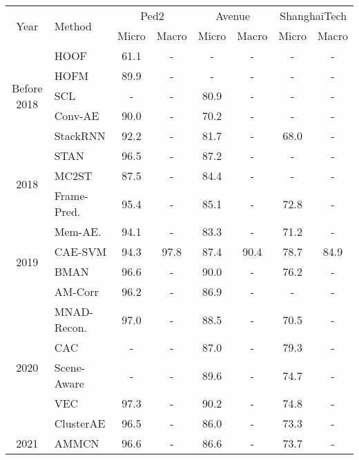 \documentclass[10pt,twocolumn,letterpaper]{article}
\begin{document}
\begin{table*}[t]
	\newcommand{\tabincell}[2]{\begin{tabular}{@{}#1@{}}#2\end{tabular}}
	\centering
	\begin{tabular}{| c | l | c | c | c | c | c | c |}
		\hline
		\multirow{2}{*}{Year} & \multirow{2}{*}{Method} & \multicolumn{2}{c|}{Ped2} & \multicolumn{2}{c|}{Avenue} & \multicolumn{2}{c|}{ShanghaiTech} \\ 
		\cline{3-8}
		& & Micro & Macro & Micro & Macro & Micro & Macro \\
		\hline
\multirow{5}{*}{Before 2018} & HOOF \cite{hoof3}  & 61.1 & - & - & - & - & - \\
 & HOFM \cite{hoof}  & 89.9 & - & - & - & - & - \\
 & SCL \cite{avenue}  & - & - & 80.9 & - & - & - \\
 & Conv-AE \cite{2016_CONVAE}  & 90.0 & - & 70.2 & - & - & - \\
 & StackRNN \cite{2017_STACKRNN}  & 92.2 & - & 81.7 & - & 68.0 & - \\
\hline
\multirow{3}{*}{2018} & STAN \cite{stan} & 96.5 & - & 87.2 & - & - & - \\
& MC2ST \cite{bmvc2018} & 87.5 & - & 84.4 & - & - & - \\
& Frame-Pred. \cite{shanghaitech}  & 95.4 & - & 85.1 & - & 72.8 & - \\
\hline
\multirow{4}{*}{2019} & Mem-AE. \cite{gong2019iccv}  & 94.1 & - & 83.3 & - & 71.2 & - \\
& CAE-SVM \cite{ionescu2019cvpr}  &  94.3 & 97.8 & 87.4 & 90.4 & 78.7 & 84.9 \\
& BMAN \cite{lee2019bman}  & 96.6 & - & 90.0 & - & 76.2 & - \\
& AM-Corr \cite{reconstruction_am_corr} & 96.2 & - & 86.9 & - & - & - \\ 
\hline
\multirow{5}{*}{2020} & MNAD-Recon. \cite{Park2020LearningMN}  & 97.0 & - & 88.5 & - & 70.5 & -\\
& CAC \cite{Wang2020ClusterAC}  &  - & - & 87.0 & - & 79.3 & - \\
& Scene-Aware \cite{Sun2020SceneAwareCR}  & - & - & 89.6 & - & 74.7 & - \\
& VEC \cite{yu2020cloze}  & 97.3 & - & 90.2 & - & 74.8 & -\\
& ClusterAE \cite{reconstruction_clusterAE} & 96.5 & - & 86.0 & - & 73.3 & - \\
\hline
\multirow{6}{*}{2021} & AMMCN \cite{Cai2021AppearanceMotionMC} & 96.6 & - & 86.6 & - & 73.7 & - \\

\end{tabular}
\end{table*}
\end{document}
